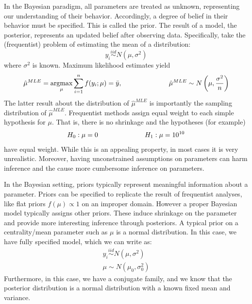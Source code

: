 \documentclass[twoside,12pt,bibstyle=chem-acs]{reedthesis}
\begin{document}
In the Bayesian paradigm, all parameters are treated as unknown, representing our understanding of their behavior. Accordingly, a degree of belief in their behavior must be specified. This is called the prior. The result of a model, the posterior, represents an updated belief after observing data. Specifically, take the (frequentist) problem of estimating the mean of a distribution:
\begin{equation*}
y_i \overset{iid}\sim N(\mu, \sigma^2) \tag{$i = 1, \dots, n$}
\end{equation*}
where $\sigma^2$ is known. Maximum likelihood estimates yield
\begin{equation*}
\hat\mu^{MLE} = \underset{\mu}{\mathrm{argmax}} \sum_{i=1}^n f(y_i; \mu) = \bar{y}, \hspace{0.2\linewidth} \hat\mu^{MLE} \sim N\left(\mu, \frac{\sigma^2}{n}\right)
\end{equation*}
The latter result about the distribution of $\hat\mu^{MLE}$ is importantly the sampling distribution of $\hat\mu^{MLE}$. Frequentist methods assign equal weight to each simple hypothesis for $\mu$. That is, there is no shrinkage and the hypotheses (for example)
\begin{equation*}
H_0: \mu = 0 \hspace{0.2\linewidth} H_1: \mu = 10^{10}
\end{equation*}
have equal weight. While this is an appealing property, in most cases it is very unrealistic. Moreover, having unconstrained assumptions on parameters can harm inference \cite{strawderman_charles_2021} and the cause more cumbersome inference on parameters.

In the Bayesian setting, priors typically represent meaningful information about a parameter. Priors can be specified to replicate the result of frequentist analyses, like flat priors $f(\mu) \propto 1$ on an improper domain. However a proper Bayesian model typically assigns other priors. These induce shrinkage on the parameter and provide more interesting inference through posteriors. A typical prior on a centrality/mean parameter such as $\mu$ is a normal distribution. In this case, we have fully specified model, which we can write as:
\begin{align*}
y_i \overset{iid}\sim N(\mu, \sigma^2) \\
\mu \sim N(\mu_0, \sigma_0^2)
\end{align*}
Furthermore, in this case, we have a conjugate family, and we know that the posterior distribution is a normal distribution with a known fixed mean and variance.
\end{document}
